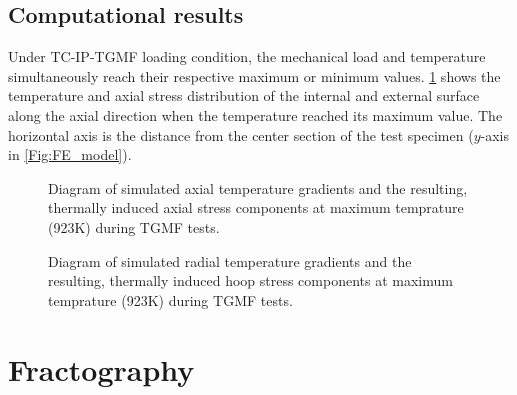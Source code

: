 \renewcommand\arraystretch{1}

\subsection{Computational results}
\noindent
Under TC-IP-TGMF loading condition, the mechanical load and temperature simultaneously reach their respective maximum or minimum values.
\ref{Fig:plot_temperature_along_gauge_length} shows the temperature and axial stress distribution of the internal and external surface along the axial direction when the temperature reached its maximum value.
The horizontal axis is the distance from the center section of the test specimen ($y$-axis in \ref{Fig:FE_model}). 


\begin{figure}[!htp]
\caption{Diagram of simulated axial temperature gradients and the resulting, thermally induced axial stress components at maximum temprature (923K) during TGMF tests.}
\label{Fig:plot_temperature_along_gauge_length}
\end{figure}


\begin{figure}[!htp]
\caption{Diagram of simulated radial temperature gradients and the resulting, thermally induced hoop stress components at maximum temprature (923K) during TGMF tests.}
\label{Fig:plot_temperature_along_radial_direction}
\end{figure}


\section{Fractography}

